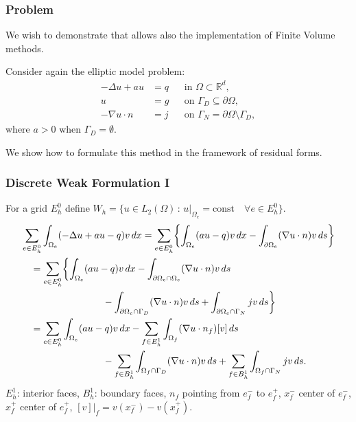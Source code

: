 \begin{frame}
\frametitle{Problem}
We wish to demonstrate that allows also the implementation of Finite Volume methods.

Consider again the elliptic model problem:
\begin{subequations} \label{Eq:Example04}
\begin{align*}
 -\Delta u + a u  &= q &&\text{in $\Omega\subset\mathbb{R}^d$},\\
                u &= g &&\text{on $\Gamma_D\subseteq\partial\Omega$},\\
-\nabla u \cdot n &= j &&\text{on $\Gamma_N=\partial\Omega\setminus\Gamma_D$},
\end{align*}
\end{subequations}
where $a>0$ when $\Gamma_D=\emptyset$.

We show how to formulate this method in the framework of residual forms.
\end{frame}

\begin{frame}
\frametitle{Discrete Weak Formulation I}
For a grid $E_h^0$ define $W_h = \{ u \in L_2(\Omega) \,:\, 
u|_{\Omega_e} = \text{const} \quad \forall e\in E_h^0\}$.
\begin{equation*}
\begin{split}
& \sum_{e\in E_h^0} \int_{\Omega_e} (-\Delta u + au - q) v \, dx = 
\sum_{e\in E_h^0} \biggl\{ \int_{\Omega_e} (au - q) v \, dx - 
\int_{\partial\Omega_e} (\nabla u\cdot n) v \, ds \biggr\}\\
&\quad = \sum_{e\in E_h^0} \biggl\{ \int_{\Omega_e} (au - q) v \, dx
- \int_{\partial\Omega_e\cap\Omega_e} (\nabla u\cdot n) v \, ds\\
&\hspace{30mm} - \int_{\partial\Omega_e\cap\Gamma_D} (\nabla u\cdot n) v \, ds
+ \int_{\partial\Omega_e\cap\Gamma_N} j v \, ds \biggr\}\\
&\quad = \sum_{e\in E_h^0} \int_{\Omega_e} (au - q) v \, dx
- \sum_{f\in E_h^1} \int_{\Omega_f} (\nabla u\cdot n_f) [v] \, ds\\
&\hspace{30mm} - \sum_{f\in B_h^1} \int_{\Omega_f\cap\Gamma_D} (\nabla u\cdot n) v \, ds
+ \sum_{f\in B_h^1} \int_{\Omega_f\cap\Gamma_N} j v \, ds .
\end{split}
\end{equation*}
$E_h^1$: interior faces, $B_h^1$: boundary faces, $n_f$ pointing from $e^-_f$ to $e^+_f$,
$x_f^-$ center of $e_f^-$, $x_f^+$ center of $e_f^+$, $[v]|_f = v(x_f^-) - v(x_f^+)$.
\end{frame}


